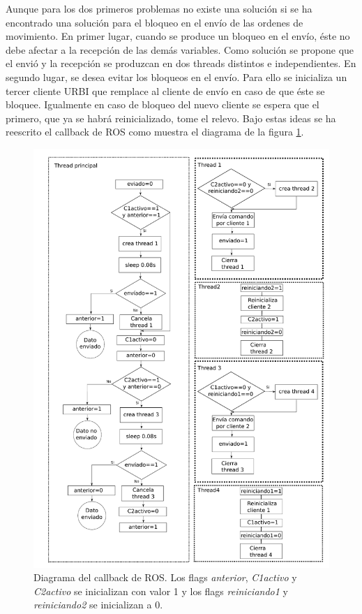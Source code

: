 \documentclass[12pt,a4paper,final,twoside]{book}
\begin{document}
Aunque para los dos primeros problemas no existe una solución si se ha encontrado una solución para el bloqueo en el envío de las ordenes de movimiento. 
En primer lugar, cuando se produce un bloqueo en el envío, éste no debe afectar a la recepción de las demás variables. Como solución se propone que el envió y la recepción se produzcan en dos threads distintos e independientes. 
En segundo lugar, se desea evitar los bloqueos en el envío. Para ello se inicializa un tercer cliente URBI que remplace al cliente de envío en caso de que éste se bloquee. Igualmente en caso de bloqueo del nuevo cliente se espera que el primero, que ya se habrá reinicializado, tome el relevo.
Bajo estas ideas se ha reescrito el callback de ROS como muestra el diagrama de la figura \ref{fig:Call}.
\newpage
\begin{figure}[H]
	\centering
    \includegraphics[scale=0.7]{images/esquemaCall.pdf}
	 \caption{Diagrama del callback de ROS. Los flags \textit{anterior}, \textit{C1activo} y \textit{C2activo}  se inicializan con valor 1 y los flags \textit{reiniciando1} y \textit{reiniciando2} se inicializan a 0.}
  \label{fig:Call}
\end{figure}
\end{document}
